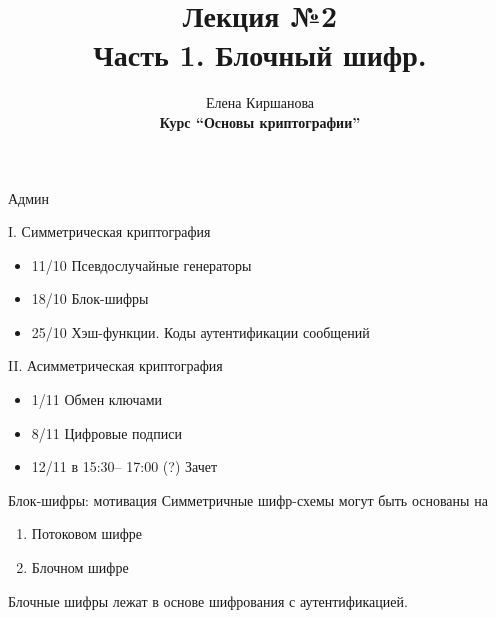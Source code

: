 \documentclass[usenames,dvipsnames,8pt,aspectratio=169]{beamer}
\title{Лекция №2 \\[10pt]
	Часть 1. Блочный шифр.}
\date{ Елена Киршанова \\  \textbf{Курс ``Основы криптографии''} \\  }
\begin{document}
	
\begin{frame}
	\titlepage
\end{frame}

\begin{frame}{Админ}
	
	\Large
	{\color{Orange} I. Симметрическая криптография} \\[10pt]
	\begin{itemize}
		\item 11/10 Псевдослучайные генераторы
		\item 18/10 Блок-шифры
		\item 25/10 Хэш-функции. Коды аутентификации сообщений 
	\end{itemize}
	
	\vspace{20pt}
	{\color{Orange} II. Асимметрическая криптография}
	
	\begin{itemize}
		\item 1/11 Обмен ключами
		\item 8/11 Цифровые подписи
	\end{itemize}

	\begin{itemize}
		\item {\color{Orange}12/11 в  15:30-- 17:00 (?) } Зачет
	\end{itemize}

	
\end{frame}


\begin{frame}{Блок-шифры: мотивация}
\LARGE 
	Симметричные шифр-схемы могут быть основаны на
	
	\begin{enumerate}
		\itemsep 10pt
		\item Потоковом шифре 
		\item Блочном  шифре
	\end{enumerate}

	\vspace{20pt}
	Блочные шифры лежат в основе {\color{Orange} шифрования с аутентификацией.}
\end{frame}
\end{document}
